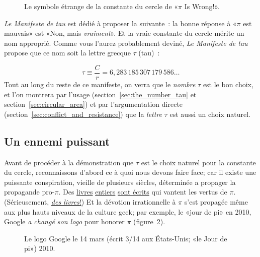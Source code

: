 \begin{figure}
\caption{Le symbole étrange de la constante du cercle de «\ns $\pi$ Is Wrong!\ns ».\label{fig:palais_tau}}
\end{figure}

\emph{Le Manifeste de tau} est dédié à proposer la suivante~:  la bonne
réponse à «\ns $\pi$ est mauvais\ns » est «\ns Non, mais \emph{vraiment}\ns ». Et la vraie
constante du cercle mérite un nom approprié. Comme vous l'aurez probablement deviné,
\emph{Le Manifeste de tau} propose que ce nom soit la lettre grecque $\tau$
(tau)~:

\begin{equation}
\label{eq:tau}
\tau \equiv \frac{C}{r} = 6{,}283\,185\,307\,179\,586\ldots
\end{equation}
Tout au long du reste de ce manifeste, on verra que le \emph{nombre} $\tau$ est
le bon choix, et l'on montrera par l'usage (section~\ref{sec:the_number_tau}
et section~\ref{sec:circular_area}) et par l'argumentation directe
(section~\ref{sec:conflict_and_resistance}) que la \emph{lettre} $\tau$ est aussi
un choix naturel.

\subsection{Un ennemi puissant} %
 \label{sec:a_powerful_enemy}
 
Avant de procéder à la démonstration que $\tau$ est le choix naturel pour la
constante du cercle, reconnaissons d'abord ce à quoi nous devons faire face\ns; car il existe
une puissante conspiration, vieille de plusieurs siècles, déterminée a propager
la propagande pro-$\pi$. Des
\href{https://www.amazon.fr/fascinant-nombre-ESSAIS-SCIEN-ebook/dp/B07D3SYP5X/}{livres}
\href{https://www.amazon.fr/1-000-000-Décimales-Nombre-Plus-Connu/dp/B085DMM9XV/}{entiers}
\href{https://www.amazon.fr/Autour-du-nombre-pi-HR-ACT-SC-INDUS-ebook/dp/B081HGQSQJ/}{sont
écrits} qui vantent les vertus de $\pi$. (Sérieusement,
\href{https://www.amazon.com/exec/obidos/ISBN=0802713327/}{\emph{des
livres}\ns!}) Et la dévotion irrationnelle à $\pi$ s'est propagée même aux
plus hauts niveaux de la culture geek\ns; par exemple, le «\ns jour de pi\ns » en 2010,
\href{https://www.google.com/}{Google} \emph{a changé son logo} pour honorer
$\pi$ (figure~\ref{fig:google_pi_day.}).

\begin{figure}
\begin{center}
\end{center}
\caption{Le logo Google le 14 mars (écrit 3/14 aux États-Unis\ns; «\ns le Jour de
pi\ns ») 2010.\label{fig:google_pi_day.}}
\end{figure}

